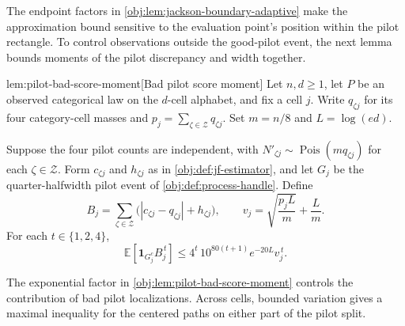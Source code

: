 The endpoint factors in \cref{obj:lem:jackson-boundary-adaptive} make the approximation bound sensitive to the evaluation point’s position within the pilot rectangle. To control observations outside the good-pilot event, the next lemma bounds moments of the pilot discrepancy and width together.

\begin{lemmav}{lem:pilot-bad-score-moment}[Bad pilot score moment]
Let \(n,d\geq 1\), let \(P\) be an observed categorical law on the \(d\)-cell alphabet, and fix a cell \(j\). Write \(q_{\zeta j}\) for its four category-cell masses and \(p_j=\sum_{\zeta\in\mathcal Z}q_{\zeta j}\). Set \(m=n/8\) and \(L=\log(ed)\).

Suppose the four pilot counts are independent, with \(N'_{\zeta j}\sim\operatorname{Pois}(mq_{\zeta j})\) for each \(\zeta\in\mathcal Z\). Form \(c_{\zeta j}\) and \(h_{\zeta j}\) as in \cref{obj:def:jf-estimator}, and let \(G_j\) be the quarter-halfwidth pilot event of \cref{obj:def:process-handle}. Define
\[
B_j=\sum_{\zeta\in\mathcal Z}\bigl(|c_{\zeta j}-q_{\zeta j}|+h_{\zeta j}\bigr),
\qquad
v_j=\sqrt{\frac{p_jL}{m}}+\frac{L}{m}.
\]
For each \(t\in\{1,2,4\}\),
\[
\mathbb E\!\left[\mathbf 1_{G_j^c}B_j^{\,t}\right]
\leq
4^t\,10^{80(t+1)}e^{-20L}v_j^{\,t}.
\]
\end{lemmav}

The exponential factor in \cref{obj:lem:pilot-bad-score-moment} controls the contribution of bad pilot localizations. Across cells, bounded variation gives a maximal inequality for the centered paths on either part of the pilot split.

